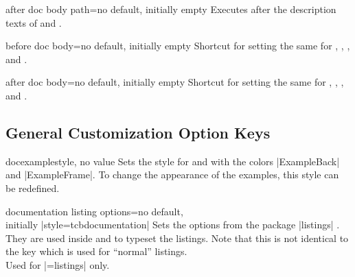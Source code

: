 \begin{docTcbKey}[][doc new=2019-09-18]{after doc body path}{=}{no default, initially empty}
  Executes  after the description texts
  of  and .
\end{docTcbKey}


\begin{docTcbKey}[][doc new and updated={2015-10-09}{2019-09-18}]{before doc body}{=}{no default, initially empty}
  Shortcut for setting the same  for
  , ,
  , and .
\end{docTcbKey}

\begin{docTcbKey}[][doc new and updated={2015-10-09}{2019-09-18}]{after doc body}{=}{no default, initially empty}
  Shortcut for setting the same  for
  , ,
  , and .
\end{docTcbKey}







\clearpage
\subsection{General Customization Option Keys}

\begin{docTcbKey}[][doc updated=2015-03-16]{docexample}{}{style, no value}
  Sets the style for  and 
  with the colors |ExampleBack| and |ExampleFrame|.
  To change the appearance of the examples, this style can be
  redefined.
\begin{dispListing}
\end{dispListing}
\end{docTcbKey}

\begin{docTcbKey}{documentation listing options}{=}{no default,\\\hspace*{\fill} initially |style=tcbdocumentation|}
  Sets the options from the package |listings| \cite{hoffmann:listings}.
  They are used inside  and  to typeset
  the listings. Note that this is not identical to the key
   which is used for \enquote{normal} listings.\\
  Used for |=listings| only.
\end{docTcbKey}

